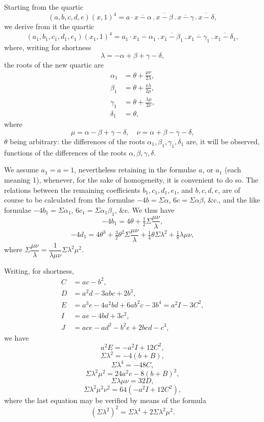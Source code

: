 \documentclass[11pt,a4paper]{article}
\begin{document}
Starting from the quartic
\[
(a, b, c, d, e)(x, 1)^{4} = a \cdot \overline{x - \alpha}\,.\,\overline{x - \beta}\,.\,\overline{x - \gamma}\,.\,\overline{x - \delta},
\]
we derive from it the quartic
\[
(a_{1}, b_{1}, c_{1}, d_{1}, e_{1})(x_{1}, 1)^{4} = a_{1} \cdot \overline{x_{1} - \alpha_{1}}\,.\,\overline{x_{1} - \beta_{1}}\,.\,\overline{x_{1} - \gamma_{1}}\,.\,\overline{x_{1} - \delta_{1}},
\]
where, writing for shortness
\[
\lambda = -\alpha + \beta + \gamma - \delta,
\]
the roots of the new quartic are
\[
\begin{aligned}
\alpha_{1} &= \theta + \frac{\mu\nu}{2\lambda},\\
\beta_{1} &= \theta + \frac{\nu\lambda}{2\mu},\\
\gamma_{1} &= \theta + \frac{\lambda\mu}{2\nu},\\
\delta_{1} &= \theta,
\end{aligned}
\]
where
\[
\mu = \alpha - \beta + \gamma - \delta, \quad \nu = \alpha + \beta - \gamma - \delta,
\]
$\theta$ being arbitrary: the differences of the roots $\alpha_{1}, \beta_{1}, \gamma_{1}, \delta_{1}$ are, it will be observed, functions of the differences of the roots $\alpha, \beta, \gamma, \delta$.

\newpage


We assume $a_{1} = a = 1$, nevertheless retaining in the formulae $a$, or $a_{1}$ (each meaning 1), whenever, for the sake of homogeneity, it is convenient to do so. The relations between the remaining coefficients $b_{1}, c_{1}, d_{1}, e_{1}$, and $b, c, d, e$, are of course to be calculated from the formulae $-4b = \Sigma\alpha$, $6c = \Sigma\alpha\beta$, \&c., and the like formulae $-4b_{1} = \Sigma\alpha_{1}$, $6c_{1} = \Sigma\alpha_{1}\beta_{1}$, \&c. We thus have
\[
-4b_{1} = 4\theta + \tfrac{1}{2}\Sigma\frac{\mu\nu}{\lambda},
\]
\[
- 4d_{1} = 4\theta^{3} + \tfrac{3}{2}\theta^{2}\Sigma\frac{\mu\nu}{\lambda} + \tfrac{1}{4}\theta\Sigma\lambda^{2} + \tfrac{1}{8}\lambda\mu\nu,
\]
where $\Sigma\dfrac{\mu\nu}{\lambda} = \dfrac{1}{\lambda\mu\nu}\Sigma\lambda^{2}\mu^{2}$.

Writing, for shortness,
\[
\begin{aligned}
C &= ac - b^{2},\\
D &= a^{2}d - 3abc + 2b^{3},\\
E &= a^{3}e - 4a^{2}bd + 6ab^{2}c - 3b^{4} = a^{2}I - 3C^{2},\\
I &= ae - 4bd + 3c^{2},\\
J &= ace - ad^{2} - b^{2}e + 2bcd - c^{3},
\end{aligned}
\]
we have
\[
a^{2}E = -a^{2}I + 12C^{2},
\]
\[
\Sigma\lambda^{2} = -4(b + B),
\]
\[
\Sigma\lambda^{4} = -48C,
\]
\[
\Sigma\lambda^{2}\mu^{2} = 24a^{2}c - 8(b + B)^{2},
\]
\[
\Sigma\lambda\mu\nu = 32D,
\]
\[
\Sigma\lambda^{2}\mu^{2}\nu^{2} = 64(-a^{2}I + 12C^{2}),
\]
where the last equation may be verified by means of the formula
\[
(\Sigma\lambda^{2})^{2} = \Sigma\lambda^{4} + 2\Sigma\lambda^{2}\mu^{2}.
\]
\end{document}
